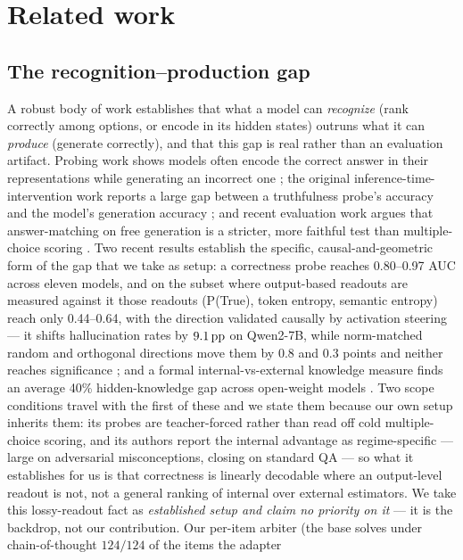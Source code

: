\section{Related work}\label{sec:related}

\subsection{The recognition--production gap}\label{related:gap}

A robust body of work establishes that what a model can \emph{recognize} (rank
correctly among options, or encode in its hidden states) outruns what it can
\emph{produce} (generate correctly), and that this gap is real rather than an
evaluation artifact. Probing work
shows models often encode the correct answer in their representations while
generating an incorrect one \citep{LLMsKnowMore}; the original
inference-time-intervention work reports a large gap between a truthfulness probe's
accuracy and the model's generation accuracy \citep{ITI}; and recent evaluation work
argues that answer-matching on free generation is a stricter, more faithful test
than multiple-choice scoring \citep{AnswerMatching}. Two recent results establish
the specific, causal-and-geometric form of the gap that we take as setup: a correctness
probe reaches 0.80--0.97 AUC across eleven models, and on the subset where
output-based readouts are measured against it those readouts (P(True), token entropy,
semantic entropy) reach only 0.44--0.64, with the direction validated causally by
activation steering --- it shifts hallucination rates by $9.1\,\mathrm{pp}$ on Qwen2-7B, while
norm-matched random and orthogonal directions move them by $0.8$ and $0.3$ points and
neither reaches significance \citep{ConfidenceManifold}; and a formal
internal-vs-external knowledge measure finds an average 40\% hidden-knowledge gap
across open-weight models \citep{InsideOut}. Two scope conditions travel with the
first of these and we state them because our own setup inherits them: its probes are
teacher-forced rather than read off cold multiple-choice scoring, and its authors
report the internal advantage as regime-specific --- large on adversarial
misconceptions, closing on standard QA --- so what it establishes for us is that
correctness is linearly decodable where an output-level readout is not, not a general
ranking of internal over external estimators. We take this lossy-readout fact as \emph{established setup and
claim no priority on it} --- it is the backdrop, not our contribution. Our per-item
arbiter (the base solves under chain-of-thought $124/124$ of the items the adapter
